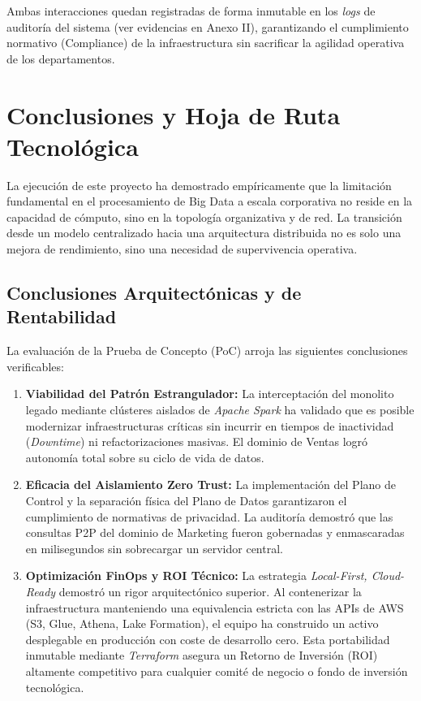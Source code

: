 \documentclass[12pt, a4paper]{article}
\begin{document}
Ambas interacciones quedan registradas de forma inmutable en los \textit{logs} de auditoría del sistema (ver evidencias en Anexo II), garantizando el cumplimiento normativo (Compliance) de la infraestructura sin sacrificar la agilidad operativa de los departamentos.

\section{Conclusiones y Hoja de Ruta Tecnológica}

La ejecución de este proyecto ha demostrado empíricamente que la limitación fundamental en el procesamiento de Big Data a escala corporativa no reside en la capacidad de cómputo, sino en la topología organizativa y de red. La transición desde un modelo centralizado hacia una arquitectura distribuida no es solo una mejora de rendimiento, sino una necesidad de supervivencia operativa.

\subsection{Conclusiones Arquitectónicas y de Rentabilidad}

La evaluación de la Prueba de Concepto (PoC) arroja las siguientes conclusiones verificables:

\begin{enumerate}
    \item \textbf{Viabilidad del Patrón Estrangulador:} La interceptación del monolito legado mediante clústeres aislados de \textit{Apache Spark} ha validado que es posible modernizar infraestructuras críticas sin incurrir en tiempos de inactividad (\textit{Downtime}) ni refactorizaciones masivas. El dominio de Ventas logró autonomía total sobre su ciclo de vida de datos.
    \item \textbf{Eficacia del Aislamiento Zero Trust:} La implementación del Plano de Control y la separación física del Plano de Datos garantizaron el cumplimiento de normativas de privacidad. La auditoría demostró que las consultas P2P del dominio de Marketing fueron gobernadas y enmascaradas en milisegundos sin sobrecargar un servidor central.
    \item \textbf{Optimización FinOps y ROI Técnico:} La estrategia \textit{Local-First, Cloud-Ready} demostró un rigor arquitectónico superior. Al contenerizar la infraestructura manteniendo una equivalencia estricta con las APIs de AWS (S3, Glue, Athena, Lake Formation), el equipo ha construido un activo desplegable en producción con coste de desarrollo cero. Esta portabilidad inmutable mediante \textit{Terraform} asegura un Retorno de Inversión (ROI) altamente competitivo para cualquier comité de negocio o fondo de inversión tecnológica.
\end{enumerate}
\end{document}
